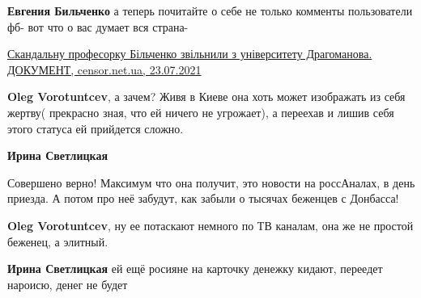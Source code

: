 \begin{itemize}
\begin{itemize}
\textbf{Евгения Бильченко} а теперь почитайте о себе не только комменты пользователи фб- вот что о вас думает вся страна-

\href{https://censor.net/ua/news/3278901/skandalnu_profesorku_bilchenko_zvilnyly_z_universytetu_dragomanova_dokument}{%
Скандальну професорку Більченко звільнили з університету Драгоманова. ДОКУМЕНТ, censor.net.ua, 23.07.2021%
}

 
\textbf{Oleg Vorotuntcev}, а зачем? Живя в Киеве она хоть может изображать из себя жертву( прекрасно зная, что ей ничего не угрожает), а переехав и лишив себя этого статуса ей прийдется сложно.

 
\textbf{Ирина Светлицкая}

Совершено верно! Максимум что она получит, это новости на россАналах, в день
приезда. А потом про неё забудут, как забыли о тысячах беженцев с Донбасса!


 
\textbf{Oleg Vorotuntcev}, ну ее потаскают немного по ТВ каналам, она же не простой беженец, а элитный.

 
\textbf{Ирина Светлицкая} ей ещё росияне на карточку денежку кидают, переедет нароисю, денег не будет

 

\end{itemize}
\end{itemize}
